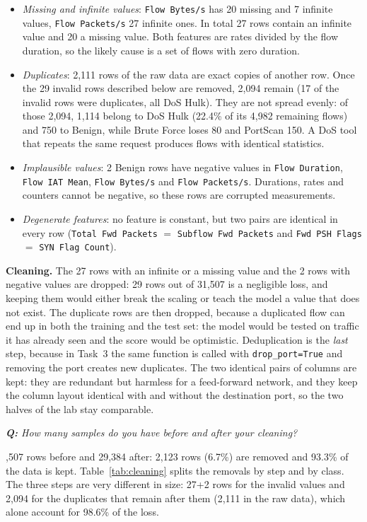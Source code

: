 \documentclass[9pt]{extarticle}
\newcommand{\qa}[1]{\par\vspace{2pt}\noindent\textit{\textbf{Q:} #1}\par\nopagebreak\noindent}
\begin{document}
\begin{itemize}
  \item \emph{Missing and infinite values}: \texttt{Flow Bytes/s} has 20 missing and 7 infinite
        values, \texttt{Flow Packets/s} 27 infinite ones. In total 27 rows contain an infinite
        value and 20 a missing value. Both features are rates divided by the flow duration, so
        the likely cause is a set of flows with zero duration.
  \item \emph{Duplicates}: 2,111 rows of the raw data are exact copies of another row. Once the
        29 invalid rows described below are removed, 2,094 remain (17 of the invalid rows were
        duplicates, all DoS Hulk). They are not spread evenly: of those 2,094, 1,114 belong to DoS
        Hulk (22.4\% of its 4,982 remaining flows) and 750 to Benign, while Brute Force loses 80
        and PortScan 150. A DoS tool that repeats the same request produces flows
        with identical statistics.
  \item \emph{Implausible values}: 2 Benign rows have negative values in \texttt{Flow Duration},
        \texttt{Flow IAT Mean}, \texttt{Flow Bytes/s} and \texttt{Flow Packets/s}. Durations,
        rates and counters cannot be negative, so these rows are corrupted measurements.
  \item \emph{Degenerate features}: no feature is constant, but two pairs are identical in every
        row (\texttt{Total Fwd Packets} $=$ \texttt{Subflow Fwd Packets} and
        \texttt{Fwd PSH Flags} $=$ \texttt{SYN Flag Count}).
\end{itemize}

\textbf{Cleaning.} The 27 rows with an infinite or a missing value and the 2 rows with negative
values are dropped: 29 rows out of 31,507 is a negligible loss, and keeping them would either break
the scaling or teach the model a value that does not exist. The duplicate rows are then dropped,
because a duplicated flow can end up in both the training and the test set: the model would be
tested on traffic it has already seen and the score would be optimistic. Deduplication is the
\emph{last} step, because in Task~3 the same function is called with \texttt{drop\_port=True} and
removing the port creates new duplicates. The two identical pairs of columns are kept: they are
redundant but harmless for a feed-forward network, and they keep the column layout identical with
and without the destination port, so the two halves of the lab stay comparable.

\qa{How many samples do you have before and after your cleaning?}
31,507 rows before and 29,384 after: 2,123 rows (6.7\%) are removed and 93.3\% of the data is
kept. Table~\ref{tab:cleaning} splits the removals by step and by class. The three steps are very
different in size: 27+2 rows for the invalid values and 2,094 for the duplicates that remain
after them (2,111 in the raw data), which alone account for 98.6\% of the loss.
\end{document}
